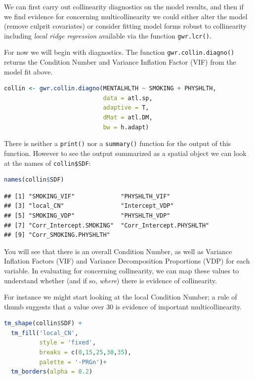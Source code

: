 \documentclass[
]{book}
\newcommand{\passthrough}[1]{#1}
\begin{document}
We can first carry out collinearity diagnostics on the model results, and then if we find evidence for concerning multicollinearity we could either alter the model (remove culprit covariates) or consider fitting model forms robust to collinearity including \emph{local ridge regression} available via the function \passthrough{\lstinline!gwr.lcr()!}.

For now we will begin with diagnostics. The function \passthrough{\lstinline!gwr.collin.diagno()!} returns the Condition Number and Variance Inflation Factor (VIF) from the model fit above.

\begin{lstlisting}[language=R]
collin <- gwr.collin.diagno(MENTALHLTH ~ SMOKING + PHYSHLTH,
                            data = atl.sp,
                            adaptive = T,
                            dMat = atl.DM,
                            bw = h.adapt)
\end{lstlisting}

There is neither a \passthrough{\lstinline!print()!} nor a \passthrough{\lstinline!summary()!} function for the output of this function. However to see the output summarized as a spatial object we can look at the names of \passthrough{\lstinline!collin$SDF!}:

\begin{lstlisting}[language=R]
names(collin$SDF)
\end{lstlisting}

\begin{lstlisting}
## [1] "SMOKING_VIF"             "PHYSHLTH_VIF"           
## [3] "local_CN"                "Intercept_VDP"          
## [5] "SMOKING_VDP"             "PHYSHLTH_VDP"           
## [7] "Corr_Intercept.SMOKING"  "Corr_Intercept.PHYSHLTH"
## [9] "Corr_SMOKING.PHYSHLTH"
\end{lstlisting}

You will see that there is an overall Condition Number, as well as Variance Inflation Factors (VIF) and Variance Decomposition Proportions (VDP) for each variable. In evaluating for concerning collinearity, we can map these values to understand whether (and if so, \emph{where}) there is evidence of collinearity.

For instance we might start looking at the local Condition Number; a rule of thumb suggests that a value over 30 is evidence of important multicollinearity.

\begin{lstlisting}[language=R]
tm_shape(collin$SDF) +
  tm_fill('local_CN',
          style = 'fixed',
          breaks = c(0,15,25,30,35),
          palette = '-PRGn')+
  tm_borders(alpha = 0.2) 
\end{lstlisting}
\end{document}
